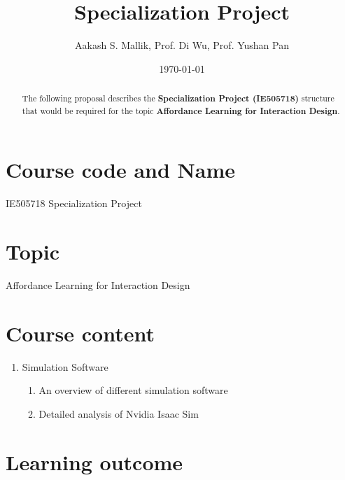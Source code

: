 \documentclass[letterpaper,12pt]{article}
\begin{document}
\title{Specialization Project}
\author{Aakash S. Mallik, Prof. Di Wu, Prof. Yushan Pan}
\date{\today}
\maketitle

\begin{abstract}
The following proposal describes the 
\textbf{Specialization Project (IE505718)} structure that would be required for the topic \textbf{Affordance Learning for Interaction Design}.
\end{abstract}


\section{Course code and Name}

IE505718 Specialization Project

\section{Topic}

Affordance Learning for Interaction Design

\section{Course content}

\begin{enumerate}
	\item Simulation Software
	\begin{enumerate}
		\item An overview of different simulation software
		\item Detailed analysis of Nvidia Isaac Sim
	\end{enumerate}
\end{enumerate}

\section{Learning outcome}
\end{document}
